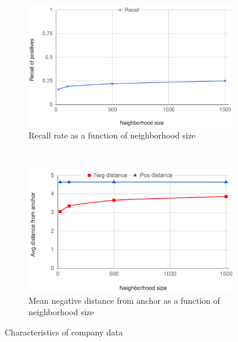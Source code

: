 \begin{figure}[htb]
    \centering
    \begin{subfigure}[t]{0.23\textwidth}
        \centering
        \includegraphics[width=.99\linewidth]{company_recall}
        \caption{Recall rate as a function of neighborhood size}
        \label{company_recall}
    \end{subfigure}%
    ~
    \begin{subfigure}[t]{0.23\textwidth}
        \centering
        \includegraphics[width=.99\linewidth]{company_distances}
        \caption{Mean negative distance from anchor as a function of neighborhood size}
        \label{modified_loss}
    \end{subfigure}
    \label{company_distances}
    \caption{Characteristics of company data}
\label{company_characteristics}
\end{figure}

